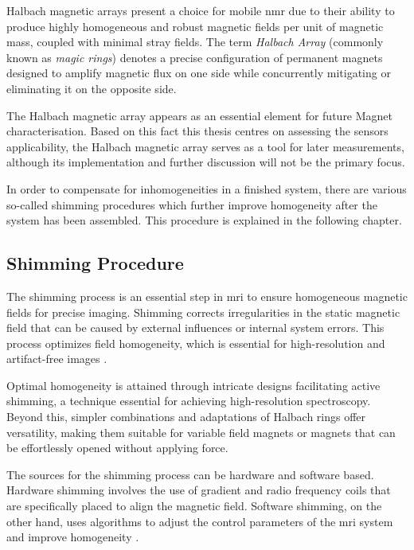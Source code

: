Halbach magnetic arrays present a choice for mobile \gls{nmr} due to
their ability to produce highly homogeneous and robust magnetic fields
per unit of magnetic mass, coupled with minimal stray fields. The term
\emph{Halbach Array} (commonly known as \emph{magic rings}) denotes a
precise configuration of permanent magnets designed to amplify magnetic
flux on one side while concurrently mitigating or eliminating it on the
opposite side. 

The Halbach magnetic array appears as an essential element for future
Magnet characterisation. Based on this fact this thesis centres on
assessing the sensors applicability, the Halbach magnetic array serves
as a tool for later measurements, although its implementation and
further discussion will not be the primary focus.

In order to compensate for inhomogeneities in a finished system, there
are various so-called shimming procedures which further improve
homogeneity after the system has been assembled. This procedure is
explained in the following chapter.

\hypertarget{shimming-procedure}{%
\subsection{Shimming Procedure}\label{shimming-procedure}}

The shimming process is an essential step in \gls{mri} to ensure
homogeneous magnetic fields for precise imaging. Shimming corrects
irregularities in the static magnetic field that can be caused by
external influences or internal system errors. This process optimizes
field homogeneity, which is essential for high-resolution and
artifact-free images .

Optimal homogeneity is attained through intricate designs facilitating
active shimming, a technique essential for achieving high-resolution
spectroscopy. Beyond this, simpler combinations and adaptations of
Halbach rings offer versatility, making them suitable for variable field
magnets or magnets that can be effortlessly opened without applying
force. 

The sources for the shimming process can be hardware and software based.
Hardware shimming involves the use of gradient and radio frequency coils
that are specifically placed to align the magnetic field.
 Software shimming, on the other hand, uses algorithms
to adjust the control parameters of the \gls{mri} system and improve
homogeneity .

